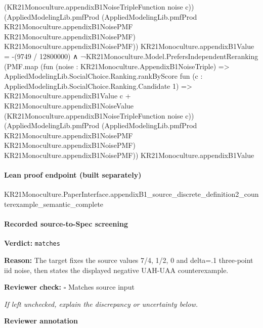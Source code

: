 \documentclass[10pt]{article}
\newcommand{\reviewerbox}{%
  \par\noindent\fbox{\parbox{0.96\linewidth}{\rule{0pt}{0.38in}}}\par
}
\newcommand{\reviewmatch}[1]{%
  \par\noindent\textbf{Reviewer check:} $\square$\; #1\par
  \noindent\emph{If left unchecked, explain the discrepancy or uncertainty below.}\par
}
\begin{document}
\begin{ReviewVerbatim}
                                (KR21Monoculture.appendixB1NoiseTripleFunction noise c))
                        (AppliedModelingLib.pmfProd
                          (AppliedModelingLib.pmfProd KR21Monoculture.appendixB1NoisePMF
                            KR21Monoculture.appendixB1NoisePMF)
                          KR21Monoculture.appendixB1NoisePMF))
                      KR21Monoculture.appendixB1Value =
                  -(9749 / 12800000) ∧
                ¬KR21Monoculture.Model.PrefersIndependentReranking
                    (PMF.map
                      (fun (noise : KR21Monoculture.AppendixB1NoiseTriple) =>
                        AppliedModelingLib.SocialChoice.Ranking.rankByScore
                          fun (c : AppliedModelingLib.SocialChoice.Ranking.Candidate 1) =>
                          KR21Monoculture.appendixB1Value c +
                            KR21Monoculture.appendixB1NoiseValue
                              (KR21Monoculture.appendixB1NoiseTripleFunction noise c))
                      (AppliedModelingLib.pmfProd
                        (AppliedModelingLib.pmfProd KR21Monoculture.appendixB1NoisePMF
                          KR21Monoculture.appendixB1NoisePMF)
                        KR21Monoculture.appendixB1NoisePMF))
                    KR21Monoculture.appendixB1Value
\end{ReviewVerbatim}

\paragraph{Lean proof endpoint (built separately)}\begin{ReviewVerbatim}
KR21Monoculture.PaperInterface.appendixB1_source_discrete_definition2_counterexample_semantic_complete
\end{ReviewVerbatim}

\paragraph{Recorded source-to-Spec screening}
\textbf{Verdict:} \texttt{matches}
\\
{\raggedright
\textbf{Reason:} The target fixes the source values 7/\allowbreak{}4, 1/\allowbreak{}2, 0 and delta=.\allowbreak{}1 three-\allowbreak{}point iid noise, then states the displayed negative UAH-\allowbreak{}UAA counterexample.\allowbreak{}
\par}
\reviewmatch{Matches source input}
\noindent\textbf{Reviewer annotation}\par
\reviewerbox
\clearpage
\hypertarget{source-claim-8c4914b3b2e7a592}{}
\end{document}
